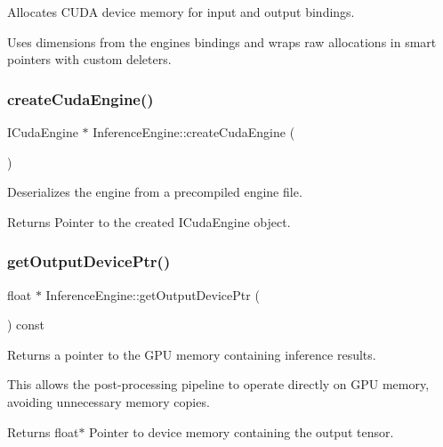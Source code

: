 Allocates C\+U\+DA device memory for input and output bindings. 

Uses dimensions from the engine\textquotesingle{}s bindings and wraps raw allocations in smart pointers with custom deleters. \mbox{\label{classInferenceEngine_a5f66425c0553c541353a634f991c1c00}} 
\subsubsection{\texorpdfstring{create\+Cuda\+Engine()}{createCudaEngine()}}
{\footnotesize\ttfamily I\+Cuda\+Engine $\ast$ Inference\+Engine\+::create\+Cuda\+Engine (\begin{DoxyParamCaption}{ }\end{DoxyParamCaption})\hspace{0.3cm}{\ttfamily [private]}}



Deserializes the engine from a precompiled engine file. 

\begin{DoxyReturn}{Returns}
Pointer to the created I\+Cuda\+Engine object. 
\end{DoxyReturn}
\mbox{\label{classInferenceEngine_a4d28ceb717d506d3984dc5742dec831d}} 
\subsubsection{\texorpdfstring{get\+Output\+Device\+Ptr()}{getOutputDevicePtr()}}
{\footnotesize\ttfamily float $\ast$ Inference\+Engine\+::get\+Output\+Device\+Ptr (\begin{DoxyParamCaption}{ }\end{DoxyParamCaption}) const}



Returns a pointer to the G\+PU memory containing inference results. 

This allows the post-\/processing pipeline to operate directly on G\+PU memory, avoiding unnecessary memory copies.

\begin{DoxyReturn}{Returns}
float$\ast$ Pointer to device memory containing the output tensor. 
\end{DoxyReturn}
\mbox{\label{classInferenceEngine_a6319576a8a3ed00e735f7996cf4e6a48}} 
